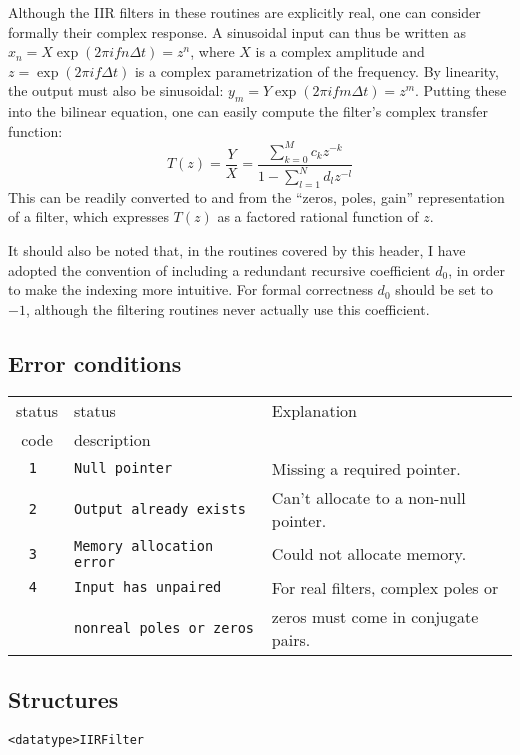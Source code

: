 Although the IIR filters in these routines are explicitly real, one
can consider formally their complex response.  A sinusoidal input can
thus be written as $x_n=X\exp(2\pi ifn\Delta t)=z^n$, where $X$ is a
complex amplitude and $z=\exp(2\pi if\Delta t)$ is a complex
parametrization of the frequency.  By linearity, the output must also
be sinusoidal: $y_m=Y\exp(2\pi ifm\Delta t)=z^m$.  Putting these into
the bilinear equation, one can easily compute the filter's complex
transfer function:
$$
T(z) = \frac{Y}{X} = \frac{\sum_{k=0}^M c_k z^{-k}}
                      {1 - \sum_{l=1}^N d_l z^{-l}}
$$
This can be readily converted to and from the ``zeros, poles, gain''
representation of a filter, which expresses $T(z)$ as a factored
rational function of $z$.

It should also be noted that, in the routines covered by this header,
I have adopted the convention of including a redundant recursive
coefficient $d_0$, in order to make the indexing more intuitive.  For
formal correctness $d_0$ should be set to $-1$, although the filtering
routines never actually use this coefficient.


\subsection{Error conditions}
\begin{tabular}{|c|l|l|}
\hline
status & status      & Explanation \\
 code  & description & \\
\hline
\tt 1  & \tt Null pointer            & Missing a required pointer.           \\
\tt 2  & \tt Output already exists   & Can't allocate to a non-null pointer. \\
\tt 3  & \tt Memory allocation error & Could not allocate memory.            \\
\tt 4  & \tt Input has unpaired      & For real filters, complex poles or    \\
       & \tt nonreal poles or zeros  & zeros must come in conjugate pairs.   \\
\hline
\end{tabular}


\subsection{Structures}
\begin{verbatim}
<datatype>IIRFilter
\end{verbatim}

